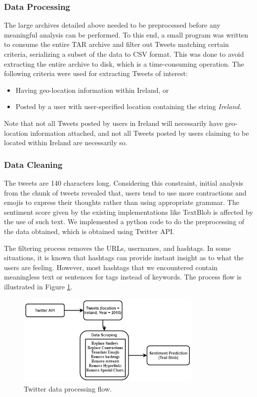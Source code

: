 \documentclass[a4paper,10pt]{article}
\begin{document}
    \subsubsection{Data Processing}

    The large archives detailed above needed to be preprocessed before any meaningful analysis can be performed. To this end, a small program was written to consume the entire TAR archive and filter out Tweets matching certain criteria, serializing a subset of the data to CSV format. This was done to avoid extracting the entire archive to disk, which is a time-consuming operation. The following criteria were used for extracting Tweets of interest:
    \begin{itemize}
        \item{
            Having geo-location information within Ireland, or
        }
        \item{
            Posted by a user with user-specified location containing the string \textit{Ireland}.
        }
    \end{itemize}

    Note that not all Tweets posted by users in Ireland will necessarily have geo-location information attached, and not all Tweets posted by users claiming to be located within Ireland are necessarily so.

    \subsubsection{Data Cleaning}

    The tweets are 140 characters long. Considering this constraint, initial analysis from the chunk of tweets revealed that, users tend to use more contractions and emojis to express their thoughts rather than using appropriate grammar. The sentiment score given by the existing implementations like TextBlob is affected by the use of such text. We implemented a python code to do the preprocessing of the data obtained, which is obtained using Twitter API.

    The filtering process removes the URLs, usernames, and hashtags. In some situations, it is known that hashtags can provide instant insight as to what the users are feeling. However, most hashtags that we encountered contain meaningless text or sentences for tags instead of keywords. The process flow is illustrated in Figure \ref{fig:twitter_process_flow}.

    \begin{figure}
        \includegraphics[width=0.8\textwidth]{twitter_process_flow.jpg}
        \caption{Twitter data processing flow.}
        \label{fig:twitter_process_flow}
    \end{figure}
\end{document}
